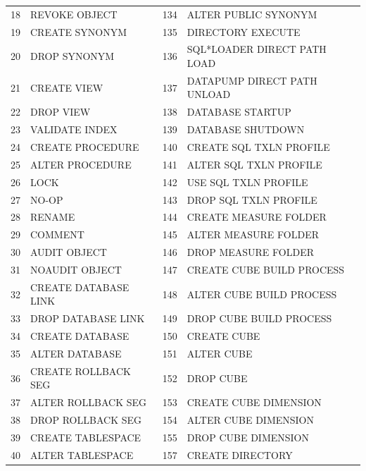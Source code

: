 \begin{appendix}
\begin{longtable}[]{@{}rl|rl@{}}
18   & REVOKE OBJECT                & 134 & ALTER PUBLIC SYNONYM         \\
19   & CREATE SYNONYM               & 135 & DIRECTORY EXECUTE            \\
20   & DROP SYNONYM                 & 136 & SQL*LOADER DIRECT PATH LOAD  \\
21   & CREATE VIEW                  & 137 & DATAPUMP DIRECT PATH UNLOAD  \\
22   & DROP VIEW                    & 138 & DATABASE STARTUP             \\
23   & VALIDATE INDEX               & 139 & DATABASE SHUTDOWN            \\
24   & CREATE PROCEDURE             & 140 & CREATE SQL TXLN PROFILE      \\
25   & ALTER PROCEDURE              & 141 & ALTER SQL TXLN PROFILE       \\
26   & LOCK                         & 142 & USE SQL TXLN PROFILE         \\
27   & NO-OP                        & 143 & DROP SQL TXLN PROFILE        \\
28   & RENAME                       & 144 & CREATE MEASURE FOLDER        \\
29   & COMMENT                      & 145 & ALTER MEASURE FOLDER         \\
30   & AUDIT OBJECT                 & 146 & DROP MEASURE FOLDER          \\
31   & NOAUDIT OBJECT               & 147 & CREATE CUBE BUILD PROCESS    \\
32   & CREATE DATABASE LINK         & 148 & ALTER CUBE BUILD PROCESS     \\
33   & DROP DATABASE LINK           & 149 & DROP CUBE BUILD PROCESS      \\
34   & CREATE DATABASE              & 150 & CREATE CUBE                  \\
35   & ALTER DATABASE               & 151 & ALTER CUBE                   \\
36   & CREATE ROLLBACK SEG          & 152 & DROP CUBE                    \\  
37   & ALTER ROLLBACK SEG           & 153 & CREATE CUBE DIMENSION        \\
38   & DROP ROLLBACK SEG            & 154 & ALTER CUBE DIMENSION         \\
39   & CREATE TABLESPACE            & 155 & DROP CUBE DIMENSION          \\
40   & ALTER TABLESPACE             & 157 & CREATE DIRECTORY             \\

\end{longtable}
\end{appendix}
